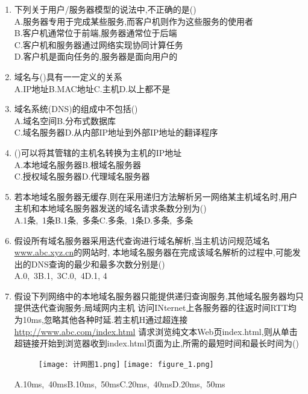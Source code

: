 \documentclass[12pt, a4paper, oneside, UTF8]{ctexbook}
\begin{document}
\begin{enumerate}
    \item 下列关于用户/服务器模型的说法中,不正确的是() \\
    A.服务器专用于完成某些服务,而客户机则作为这些服务的使用者 \\
    B.客户机通常位于前端,服务器通常位于后端 \\
    C.客户机和服务器通过网络实现协同计算任务 \\
    D.客户机是面向任务的,服务器是面向用户的

    \item 域名与()具有一一定义的关系 \\
    A.IP地址\qquad B.MAC地址\qquad C.主机\qquad D.以上都不是

    \item 域名系统(DNS)的组成中不包括() \\
    A.域名空间\qquad B.分布式数据库 \\
    C.域名服务器\qquad D.从内部IP地址到外部IP地址的翻译程序

    \item ()可以将其管辖的主机名转换为主机的IP地址 \\
    A.本地域名服务器\qquad B.根域名服务器 \\
    C.授权域名服务器\qquad D.代理域名服务器 

    \item 若本地域名服务器无缓存,则在采用递归方法解析另一网络某主机域名时,用户主机和本地域名服务器发送的域名请求条数分别为() \\
    A.1条,\ 1条\qquad B.1条,\ 多条\qquad C.多条,\ 1条\qquad D.多条,\ 多条

    \item 假设所有域名服务器采用迭代查询进行域名解析,当主机访问规范域名\underline{www.abc.xyz.cn}的网站时,
    本地域名服务器在完成该域名解析的过程中,可能发出的DNS查询的最少和最多次数分别是() \\
    A.0,\ 3\qquad B.1,\ 3\qquad C.0,\ 4\qquad D.1, 4

    \item 假设下列网络中的本地域名服务器只能提供递归查询服务,其他域名服务器均只提供迭代查询服务;局域网内主机
    访问INternet上各服务器的往返时间RTT均为10ms,忽略其他各种时延.若主机H通过超连接\underline{http://www.abc.com/index.html}
    请求浏览纯文本Web页index.html,则从单击超链接开始到浏览器收到index.html页面为止,所需的最短时间和最长时间为()  \\
    \begin{figure}[htbp]
        \centering
        \texttt{[image: 计网图1.png]}
        \texttt{[image: figure\_1.png]}
    \end{figure}
    A.10ms,\ 40ms\qquad B.10ms,\ 50ms\qquad C.20ms,\ 40ms\qquad D.20ms,\ 50ms


\end{enumerate}
\end{document}
